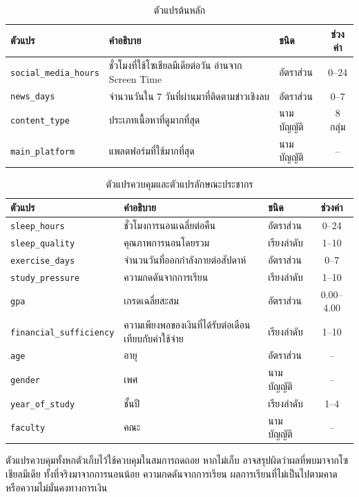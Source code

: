 \begin{table}[H]
\centering
\caption{ตัวแปรต้นหลัก}
\begin{tabularx}{\textwidth}{|l|L|l|c|}
\hline
\textbf{ตัวแปร} & \textbf{คำอธิบาย} & \textbf{ชนิด} & \textbf{ช่วงค่า} \\
\hline
\texttt{social\_media\_hours} & ชั่วโมงที่ใช้โซเชียลมีเดียต่อวัน อ่านจาก Screen Time & อัตราส่วน & 0--24 \\
\hline
\texttt{news\_days} & จำนวนวันใน 7 วันที่ผ่านมาที่ติดตามข่าวเชิงลบ & อัตราส่วน & 0--7 \\
\hline
\texttt{content\_type} & ประเภทเนื้อหาที่ดูมากที่สุด & นามบัญญัติ & 8 กลุ่ม \\
\hline
\texttt{main\_platform} & แพลตฟอร์มที่ใช้มากที่สุด & นามบัญญัติ & -- \\
\hline
\end{tabularx}
\end{table}

\begin{table}[H]
\centering
\caption{ตัวแปรควบคุมและตัวแปรลักษณะประชากร}
\begin{tabularx}{\textwidth}{|l|L|l|c|}
\hline
\textbf{ตัวแปร} & \textbf{คำอธิบาย} & \textbf{ชนิด} & \textbf{ช่วงค่า} \\
\hline
\texttt{sleep\_hours} & ชั่วโมงการนอนเฉลี่ยต่อคืน & อัตราส่วน & 0--24 \\
\hline
\texttt{sleep\_quality} & คุณภาพการนอนโดยรวม & เรียงลำดับ & 1--10 \\
\hline
\texttt{exercise\_days} & จำนวนวันที่ออกกำลังกายต่อสัปดาห์ & อัตราส่วน & 0--7 \\
\hline
\texttt{study\_pressure} & ความกดดันจากการเรียน & เรียงลำดับ & 1--10 \\
\hline
\texttt{gpa} & เกรดเฉลี่ยสะสม & อัตราส่วน & 0.00--4.00 \\
\hline
\texttt{financial\_sufficiency} & ความเพียงพอของเงินที่ได้รับต่อเดือนเทียบกับค่าใช้จ่าย & เรียงลำดับ & 1--10 \\
\hline
\texttt{age} & อายุ & อัตราส่วน & -- \\
\hline
\texttt{gender} & เพศ & นามบัญญัติ & -- \\
\hline
\texttt{year\_of\_study} & ชั้นปี & เรียงลำดับ & 1--4 \\
\hline
\texttt{faculty} & คณะ & นามบัญญัติ & -- \\
\hline
\end{tabularx}
\end{table}

\noindent
ตัวแปรควบคุมทั้งหกตัวเก็บไว้ใช้ควบคุมในสมการถดถอย
หากไม่เก็บ อาจสรุปผิดว่าผลที่พบมาจากโซเชียลมีเดีย
ทั้งที่จริงมาจากการนอนน้อย ความกดดันจากการเรียน ผลการเรียนที่ไม่เป็นไปตามคาด
หรือความไม่มั่นคงทางการเงิน

